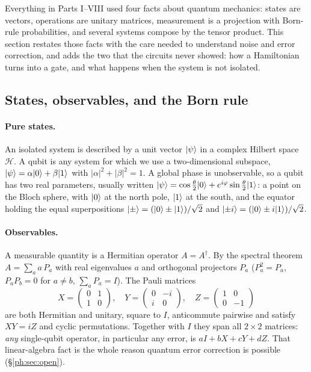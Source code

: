 Everything in Parts I--VIII used four facts about quantum mechanics: states are vectors,
operations are unitary matrices, measurement is a projection with Born-rule probabilities, and
several systems compose by the tensor product. This section restates those facts with the care
needed to understand noise and error correction, and adds the two that the circuits never showed:
how a Hamiltonian turns into a gate, and what happens when the system is not isolated.

\subsection{States, observables, and the Born rule}

\paragraph{Pure states.} An isolated system is described by a unit vector $\lvert \psi \rangle$ in a
complex Hilbert space $\mathcal H$. A qubit is any system for which we use a two-dimensional
subspace, $\lvert \psi \rangle=\alpha\lvert 0 \rangle+\beta\lvert 1 \rangle$ with $|\alpha|^2+|\beta|^2=1$. A global phase is
unobservable, so a qubit has two real parameters, usually written
$\lvert \psi \rangle=\cos\frac\theta2\lvert 0 \rangle+e^{i\varphi}\sin\frac\theta2\lvert 1 \rangle$: a point on the Bloch sphere,
with $\lvert 0 \rangle$ at the north pole, $\lvert 1 \rangle$ at the south, and the equator holding the equal
superpositions $\lvert \pm \rangle=(\lvert 0 \rangle\pm\lvert 1 \rangle)/\sqrt2$ and $\lvert \pm i \rangle=(\lvert 0 \rangle\pm i\lvert 1 \rangle)/\sqrt2$.

\paragraph{Observables.} A measurable quantity is a Hermitian operator $A=A^\dagger$. By the
spectral theorem $A=\sum_a a\,P_a$ with real eigenvalues $a$ and orthogonal projectors $P_a$
($P_a^2=P_a$, $P_aP_b=0$ for $a\ne b$, $\sum_aP_a=I$). The Pauli matrices
\[ X=\begin{pmatrix}0&1\\1&0\end{pmatrix},\quad
   Y=\begin{pmatrix}0&-i\\i&0\end{pmatrix},\quad
   Z=\begin{pmatrix}1&0\\0&-1\end{pmatrix} \]
are both Hermitian and unitary, square to $I$, anticommute pairwise and satisfy $XY=iZ$ and
cyclic permutations. Together with $I$ they span all $2\times2$ matrices: \emph{any}
single-qubit operator, in particular any error, is $aI+bX+cY+dZ$. That linear-algebra fact
is the whole reason quantum error correction is possible (\S\ref{ph:sec:open}).

